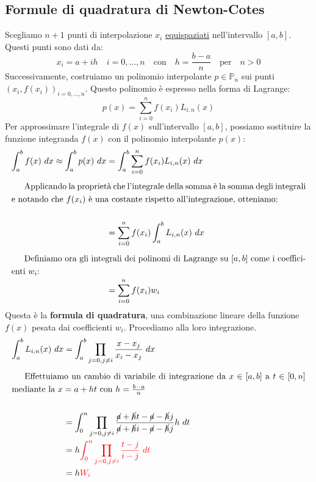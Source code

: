 \documentclass{article}
\begin{document}
\subsection{Formule di quadratura di Newton-Cotes}
Scegliamo $n+1$ punti di interpolazione $x_i$ \underline{equispaziati}
nell'intervallo $[a,b]$. Questi punti sono dati da: $$x_i=a+ih\quad
i=0,\ldots,n\quad\text{con}\quad h=\frac{b-a}{n}\quad\text{per}\quad n>0$$
Successivamente, costruiamo un polinomio interpolante $p\in \mathbb{P}_n$ sui
punti $(x_i,f(x_i))_{i=0,\ldots,n}$. Questo polinomio è espresso nella forma
di Lagrange:
$$p(x)=\displaystyle\sum_{i=0}^{n}f(x_i)L_{i,n}(x)$$
Per approssimare l'integrale di $f(x)$ sull'intervallo $[a,b]$, possiamo
sostituire la funzione integranda $f(x)$ con il polinomio interpolante $p(x)$:
\begin{equation*}
    \begin{aligned}
        \displaystyle\int_{a}^{b}f(x)\ dx\approx
        \displaystyle\int_{a}^{b}p(x)\ dx&=\displaystyle\int_{a}^{b}\displaystyle\sum_{i=0}^{n}f(x_i)L_{i,n}(x)\
        dx \\
        \alignedintertext{Applicando la proprietà che l'integrale della somma
        è la somma degli integrali e notando che $f(x_i)$ è una costante
    rispetto all'integrazione, otteniamo:}\\
                                         &=\displaystyle\sum_{i=0}^{n}f(x_i)\displaystyle\int_{a}^{b}L_{i,n}(x)\
        dx \\
        \alignedintertext{Definiamo ora gli
        integrali dei polinomi di Lagrange su $[a,b]$ come i coefficienti $w_i$:}
                                         &=\displaystyle\sum_{i=0}^{n}f(x_i)w_i
    \end{aligned}
\end{equation*}
Questa è la \textbf{formula di quadratura}, una combinazione lineare della
funzione $f(x)$ pesata dai coefficienti $w_i$. Procediamo alla loro
integrazione. 
\begin{equation*}
   \begin{aligned}
       \displaystyle\int_{a}^{b}L_{i,n}(x)\ dx&=\displaystyle\int_{a}^{b}\prod_{j=0,j\neq i}\frac{x-x_j}{x_i-x_j}\
       dx \\
       \alignedintertext{Effettuiamo un cambio di variabile di integrazione da
       $x\in[a,b]$ a $t\in[0,n]$ mediante la $x=a+ht$ con $h=\frac{b-a}{n}$}\\ 
                                              &=\displaystyle\int_{0}^{n}\prod_{j=0,j\neq
       i}\frac{\cancel{a}+\cancel{h}t-\cancel{a}-\cancel{h}j}{\cancel{a}+\cancel{h}i-\cancel{a}-\cancel{h}j}h\
       dt \\  
                                              &=h{\color{red}\displaystyle\int_{0}^{n}\prod_{j=0,j\neq
       i}\frac{t-j}{i-j}\ dt}\\ 
                                              &=h{\color{red}W_i}
   \end{aligned} 
\end{equation*}
\end{document}

